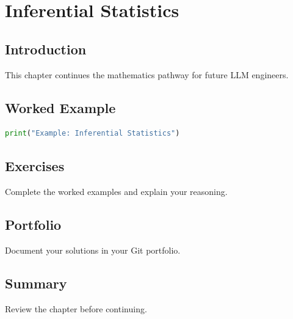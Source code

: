\chapter{Inferential Statistics}
\label{chap:vol4-27}



\section{Introduction}
This chapter continues the mathematics pathway for future LLM engineers.

\section{Worked Example}
\begin{lstlisting}[language=Python]
print("Example: Inferential Statistics")
\end{lstlisting}

\section{Exercises}
\begin{exercise}
Complete the worked examples and explain your reasoning.
\end{exercise}

\section{Portfolio}
Document your solutions in your Git portfolio.

\section{Summary}
Review the chapter before continuing.
